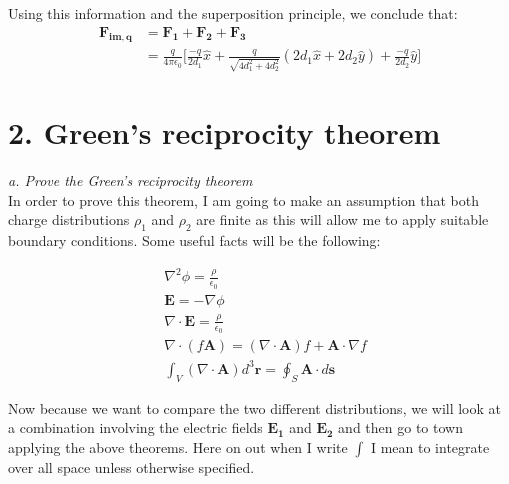 \documentclass[a4paper, 11pt]{article}
\begin{document}
Using this information and the superposition principle, we conclude that: 
	\begin{align*}
		\mathbf{F_{im,q}} &= \mathbf{F_1} + \mathbf{F_2} + \mathbf{F_3} \\ 
		&= \frac{q}{4\pi\epsilon_0} \Bigg\lbrack \frac{-q}{2d_1}\hat{x} + \frac{q}{\sqrt{4d_1^2 + 4d_2^2}}\left(2d_1 \hat{x} + 2d_2 \hat{y} \right) + \frac{-q}{2d_2}\hat{y} \Bigg\rbrack
	\end{align*}

\section*{2. Green's reciprocity theorem}
\textit{a. Prove the Green's reciprocity theorem} \\

In order to prove this theorem, I am going to make an assumption that both charge distributions $\rho_1$ and $\rho_2$ are finite as this will allow me to apply suitable boundary conditions. Some useful facts will be the following: 

\begin{align}
	&\nabla^2 \phi = \frac{\rho}{\epsilon_0} \\ 
	&\mathbf{E} = -\nabla \phi \\ 
	&\nabla \cdot \mathbf{E} = \frac{\rho}{\epsilon_0} \\ 
	&\nabla \cdot (f\mathbf{A}) = (\nabla \cdot \mathbf{A})f + \mathbf{A} \cdot \nabla f \\
	&\int_V (\nabla \cdot \mathbf{A})d^3\mathbf{r} = \oint_S \mathbf{A} \cdot d\mathbf{s} 
\end{align}

Now because we want to compare the two different distributions, we will look at a combination involving the electric fields $\mathbf{E_1}$ and $\mathbf{E_2}$ and then go to town applying the above theorems. Here on out when I write $\int$ I mean to integrate over all space unless otherwise specified.
\end{document}
